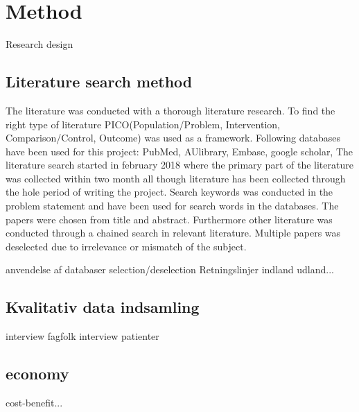 \chapter{Method}


Research design

\section{Literature search method}

The literature was conducted with a thorough literature research. To find the right type of literature PICO(Population/Problem, Intervention, Comparison/Control, Outcome) was used as a framework. %
Following databases have been used for this project: PubMed, AUlibrary, Embase, google scholar, %
The literature search started in february 2018 where the primary part of the literature was collected within two month all though literature has been collected through the hole period of writing the project. 
Search keywords was conducted in the problem statement and have been used for search words in the databases. The papers were chosen from title and abstract. Furthermore other literature was conducted through a chained search in relevant literature. Multiple papers was deselected due to irrelevance or mismatch of the subject. 



anvendelse af databaser
selection/deselection
Retningslinjer indland udland...


\section{Kvalitativ data indsamling}


interview fagfolk
interview patienter


\section{economy}


cost-benefit...









